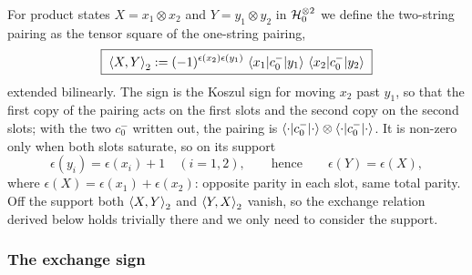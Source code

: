 For product states $X=x_1\otimes x_2$ and $Y=y_1\otimes y_2$ in ${\mathcal{H}}_0^{\otimes2}$ we define the two-string pairing as the tensor square of the one-string pairing,
\begin{equation}
  \label{pg:eq:pairing:two-def}
  \boxed{\;
  \braket{X, Y}_2
    := (-1)^{\epsilon(x_2) \epsilon(y_1)} \,
      \braket{x_1 | c_0^- | y_1} \, \braket{x_2 | c_0^- | y_2}
  \;}
\end{equation}
extended bilinearly.
The sign is the Koszul sign for moving $x_2$ past $y_1$, so that the first copy of the pairing acts on the first slots and the second copy on the second slots; with the two $c_0^-$ written out, the pairing is $\braket{\cdot|c_0^-|\cdot}\otimes\braket{\cdot|c_0^-|\cdot}$.
It is non-zero only when both slots saturate, so on its support
\begin{equation}
  \label{pg:eq:pairing:two-support}
  \epsilon(y_i)
    = \epsilon(x_i) + 1
  \quad (i = 1, 2),
  \qquad\text{hence}\qquad
  \epsilon(Y)
    = \epsilon(X),
\end{equation}
where $\epsilon(X)=\epsilon(x_1)+\epsilon(x_2)$: opposite parity in each slot, same total parity.
Off the support both $\braket{X,Y}_2$ and $\braket{Y,X}_2$ vanish, so the exchange relation derived below holds trivially there and we only need to consider the support.

\subsubsection{The exchange sign}
\label{pg:sec:pairing:sign}

